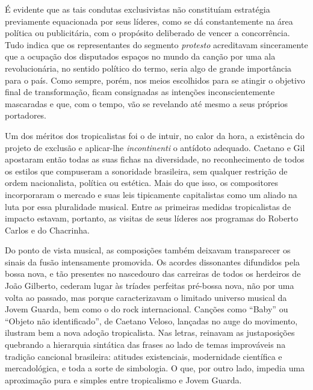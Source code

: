 É evidente que as tais condutas exclusivistas não constituíam estratégia
previamente equacionada por seus líderes, como se dá constantemente na
área política ou publicitária, com o propósito deliberado de vencer a
concorrência. Tudo indica que os representantes do segmento \textit{protesto}
acreditavam sinceramente que a ocupação dos disputados espaços no mundo
da canção por uma ala revolucionária, no sentido político do termo, 
seria algo de grande importância para o país. Como sempre, porém, nos
meios escolhidos para se atingir o objetivo final de transformação,
ficam consignadas as intenções inconscientemente mascaradas e que, com o
tempo, vão se revelando até mesmo a seus próprios portadores.

Um dos méritos dos tropicalistas foi o de intuir, no calor da hora, a
existência do projeto de exclusão e aplicar-lhe \textit{incontinenti} o antídoto
adequado. Caetano e Gil apostaram então todas as suas fichas na
diversidade, no reconhecimento de todos os estilos que compuseram a
sonoridade brasileira, sem qualquer restrição de ordem nacionalista,
política ou estética. Mais do que isso, os compositores incorporaram o
mercado e suas leis tipicamente
capitalistas como um aliado na luta por essa pluralidade musical. Entre
as primeiras medidas tropicalistas de impacto estavam, portanto, as
visitas de seus líderes aos programas do Roberto Carlos e do Chacrinha.

Do ponto de vista musical, as composições também deixavam transparecer
os sinais da fusão intensamente promovida. Os acordes dissonantes
difundidos pela bossa nova, e tão presentes no nascedouro das carreiras
de todos os herdeiros de João Gilberto, cederam lugar às tríades
perfeitas pré-bossa nova, não por uma volta ao passado, mas porque
caracterizavam o limitado universo musical da Jovem Guarda, bem como o
do rock internacional. Canções como ``Baby'' ou ``Objeto não
identificado'', de Caetano Veloso, lançadas no auge do movimento,
ilustram bem a nova adoção tropicalista. Nas letras, reinavam as
justaposições quebrando a hierarquia sintática das frases ao lado de
temas improváveis na tradição cancional brasileira: atitudes
existenciais, modernidade científica e mercadológica, e toda a sorte de
simbologia. O que, por outro lado, impedia uma aproximação pura e
simples entre tropicalismo e Jovem Guarda.

